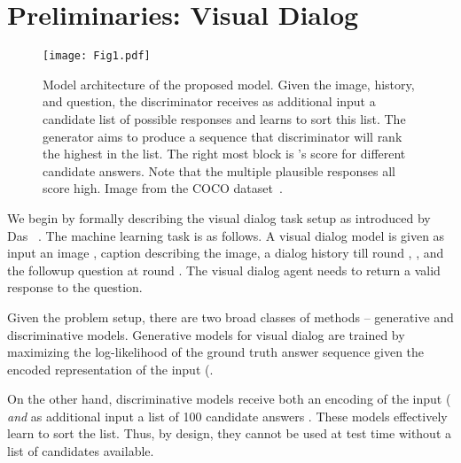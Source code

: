 \documentclass{article}
\begin{document}
 \section{Preliminaries: Visual Dialog}


\begin{figure}[t]
 \centering 
 \texttt{[image: Fig1.pdf]}
 \caption{Model architecture of the proposed model. Given the image, history, and question, the discriminator receives as additional input a candidate list of possible responses and learns to sort this list. The generator aims to produce a sequence that discriminator will rank the highest in the list. The right most block is 's score for different candidate answers. Note that the multiple plausible responses all score high. Image from the COCO dataset~\cite{lin2014microsoft}.}
 \label{fig:teaser}
 \vspace{-4mm}
\end{figure}

We begin by formally describing the visual dialog task setup as introduced by Das \etal~\cite{visdial}.
The machine learning task is as follows. A visual dialog model is given as input an image , caption  describing the image, 
a dialog history till round ,  
 ,  
and the followup question  at round . The visual dialog agent needs to return a valid response to the question. 

Given the problem setup, there are two broad classes of methods -- generative and discriminative models. 
Generative models for visual dialog are trained by maximizing the log-likelihood of the ground truth answer sequence 
given the encoded representation of the input (. 

On the other hand, discriminative models  receive both an encoding of the input ( 
\emph{and} as additional input a list of 100 candidate answers . These models effectively learn to sort the list. Thus, by design, they cannot be used 
at test time without a list of candidates available. 


 \vspace{-1mm}
\end{document}
